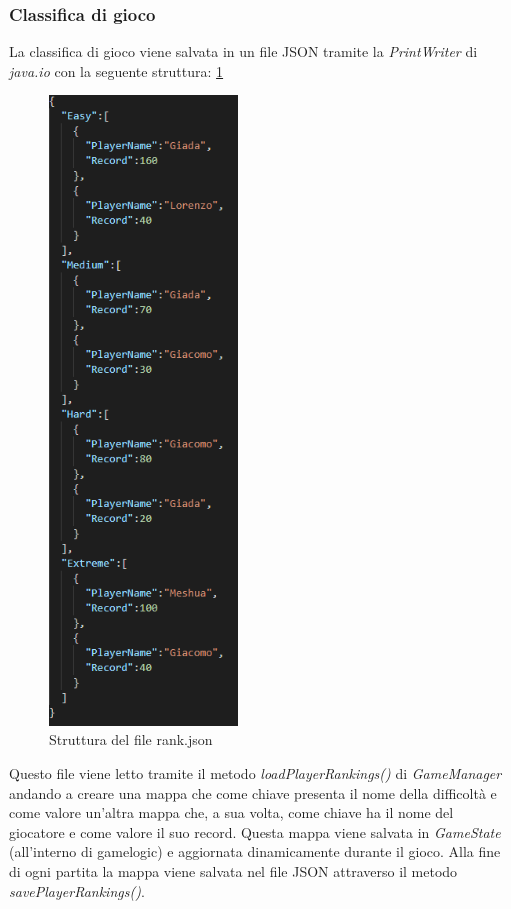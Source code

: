 \subsubsection{Classifica di gioco}
La classifica di gioco viene salvata in un file JSON tramite la \textit{PrintWriter} di \textit{java.io} con la seguente struttura: \ref{json}

\begin{figure}[H]
  \includegraphics[width=5cm]{res/6-implementazione/chiana/json.png}
  \caption{Struttura del file rank.json}
  \label{json}
\end{figure}

Questo file viene letto tramite il metodo \textit{loadPlayerRankings()} di \textit{GameManager} andando a creare una mappa che come chiave presenta il nome della difficoltà e come valore un'altra mappa che, a sua volta, come chiave ha il nome del giocatore e come valore il suo record.
Questa mappa viene salvata in \textit{GameState} (all'interno di gamelogic) e aggiornata dinamicamente durante il gioco.
Alla fine di ogni partita la mappa viene salvata nel file JSON attraverso il metodo \textit{savePlayerRankings()}.

